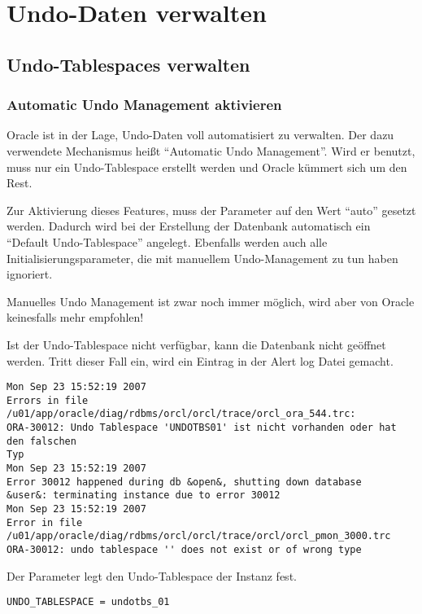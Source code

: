  \chapter{Undo-Daten verwalten}
    \setcounter{page}{1}
    \label{undodata}
    \minitoc
\newpage
    \section{Undo-Tablespaces verwalten}
      \subsection{Automatic Undo Management aktivieren}
        Oracle ist in der Lage, Undo-Daten voll automatisiert zu verwalten. Der
        dazu verwendete Mechanismus hei\ss{}t \enquote{Automatic Undo
        Management}. Wird er benutzt, muss nur ein Undo-Tablespace erstellt
        werden und Oracle k\"ummert sich um den Rest.

        Zur Aktivierung dieses Features, muss der Parameter  auf den Wert \enquote{auto} gesetzt werden. Dadurch wird bei der Erstellung der Datenbank automatisch ein \enquote{Default Undo-Tablespace} angelegt. Ebenfalls werden auch alle Initialisierungsparameter, die mit manuellem Undo-Management zu tun haben ignoriert.
        \begin{merke}
          Manuelles Undo Management ist zwar noch immer m\"oglich, wird aber von Oracle keinesfalls mehr empfohlen!
        \end{merke}
        Ist der Undo-Tablespace nicht verf\"ugbar, kann die Datenbank nicht
        geöffnet werden. Tritt dieser Fall ein, wird ein Eintrag in der Alert
        log Datei gemacht.
        \begin{lstlisting}[caption={Fehlermeldung bei nicht vorhandenem
        Undo-Tablespace},label=admin501,language=terminal]
Mon Sep 23 15:52:19 2007 
Errors in file /u01/app/oracle/diag/rdbms/orcl/orcl/trace/orcl_ora_544.trc:
ORA-30012: Undo Tablespace 'UNDOTBS01' ist nicht vorhanden oder hat den falschen
Typ
Mon Sep 23 15:52:19 2007
Error 30012 happened during db &open&, shutting down database
&user&: terminating instance due to error 30012
Mon Sep 23 15:52:19 2007
Error in file /u01/app/oracle/diag/rdbms/orcl/orcl/trace/orcl/orcl_pmon_3000.trc
ORA-30012: undo tablespace '' does not exist or of wrong type
        \end{lstlisting}
        Der Parameter  legt den Undo-Tablespace der Instanz fest.
        \begin{lstlisting}[caption={Der Parameter \parameter{undo\_management}},label=admin502,language=oracle_sql]
UNDO_TABLESPACE = undotbs_01
        \end{lstlisting}
